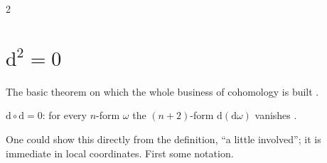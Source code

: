\begin{paracol}{2}
\section{$\mathrm d^2=0$}\label{sec:gr-dd}

The basic theorem on which the whole business of cohomology is built  .
\begin{theorem}[$\mathrm d^2=0$]\label{thm:gr-dd}
$\mathrm d\circ\mathrm d=0$: for every $n$-form $\omega$ the $(n+2)$-form $\mathrm d(\mathrm d\omega)$ vanishes   .
\end{theorem}
One could show this directly from the definition, ``a little involved''; it is immediate in local coordinates. First some notation.


\end{paracol}
